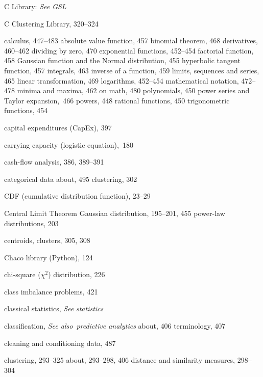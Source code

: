 \documentclass{Oreilly5980006}
\def\seealso{{\it See also}\ }
\begin{document}
\begin{theindex}
  \indexspace
\item C Library: {\it See GSL}
  \item C Clustering Library, 320--324
  \item calculus, 447--483
    \subitem absolute value function, 457
    \subitem binomial theorem, 468
    \subitem derivatives, 460--462
    \subitem dividing by zero, 470
    \subitem exponential functions, 452--454
    \subitem factorial function, 458
    \subitem Gaussian function and the Normal distribution, 455
    \subitem hyperbolic tangent function, 457
    \subitem integrals, 463
    \subitem inverse of a function, 459
    \subitem limits, sequences and series, 465
    \subitem linear transformation, 469
    \subitem logarithms, 452--454
    \subitem mathematical notation, 472--478
    \subitem minima and maxima, 462
    \subitem on math, 480
    \subitem polynomials, 450
    \subitem power series and Taylor expansion,~466
    \subitem powers, 448
    \subitem rational functions, 450
    \subitem trigonometric functions, 454
  \item capital expenditures (CapEx), 397
  \item carrying capacity (logistic equation),~180
  \item cash-flow analysis, 386, 389--391
  \item categorical data
    \subitem about, 495
    \subitem clustering, 302
  \item CDF (cumulative distribution function), 23--29
  \item Central Limit Theorem
    \subitem Gaussian distribution, 195--201, 455
    \subitem power-law distributions, 203
  \item centroids, clusters, 305, 308
\item Chaco library (Python), 124
  \item chi-square ($\chi^2$) distribution, 226
  \item class imbalance problems, 421
  \item classical statistics, {\it See} {\it statistics} %
  \item classification, \seealso{\it predictive analytics} %
    \subitem about, 406
    \subitem terminology, 407
  \item cleaning and conditioning data, 487
  \item clustering, 293--325
    \subitem about, 293--298, 406
    \subitem distance and similarity measures, 298--304

\end{theindex}
\end{document}
